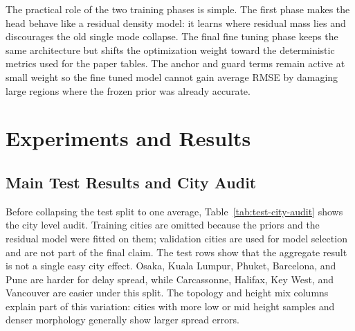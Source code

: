 \documentclass[journal]{IEEEtran}
\begin{document}
The practical role of the two training phases is simple. The first phase makes the head
behave like a residual density model: it learns where residual mass lies and
discourages the old single mode collapse. The final fine tuning phase keeps the
same architecture but shifts the optimization weight toward the deterministic
metrics used for the paper tables. The anchor and guard terms remain active at
small weight so the fine tuned model cannot gain average RMSE by damaging large
regions where the frozen prior was already accurate.

\section{Experiments and Results}

\subsection{Main Test Results and City Audit}

Before collapsing the test split to one average, Table~\ref{tab:test-city-audit}
shows the city level audit. Training cities are omitted because the priors and
the residual model were fitted on them; validation cities are used for model
selection and are not part of the final claim. The test rows show that the
aggregate result is not a single easy city effect. Osaka, Kuala Lumpur, Phuket,
Barcelona, and Pune are harder for delay spread, while Carcassonne, Halifax,
Key West, and Vancouver are easier under this split. The topology and height
mix columns explain part of this variation: cities with more low or mid height
samples and denser morphology generally show larger spread errors.
\end{document}
